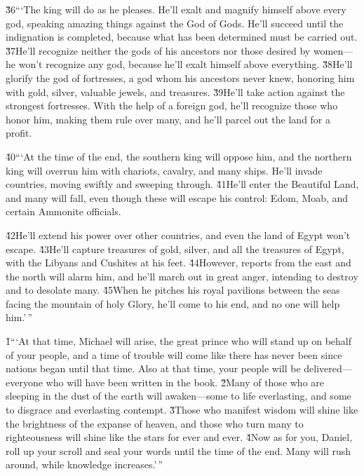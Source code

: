 \v{36}```The king will do as he pleases. He'll exalt and magnify himself above every god, speaking amazing things against the God of Gods. He'll succeed until the indignation is completed, because what has been determined must be carried out. \v{37}He'll recognize neither the gods of his ancestors nor those desired by women---he won't recognize any god, because he'll exalt himself above everything. \v{38}He'll glorify the god of fortresses, a god whom his ancestors never knew, honoring him with gold, silver, valuable jewels, and treasures. \v{39}He'll take action against the strongest fortresses. With the help of a foreign god, he'll recognize those who honor him, making them rule over many, and he'll parcel out the land for a profit.

\v{40}```At the time of the end, the southern king will oppose him, and the northern king will overrun him with chariots, cavalry, and many ships. He'll invade countries, moving swiftly and sweeping through. \v{41}He'll enter the Beautiful Land, and many will fall, even though these will escape his control: Edom, Moab, and certain Ammonite officials.

\v{42}He'll extend his power over other countries, and even the land of Egypt won't escape. \v{43}He'll capture treasures of gold, silver, and all the treasures of Egypt, with the Libyans and Cushites at his feet. \v{44}However, reports from the east and the north will alarm him, and he'll march out in great anger, intending to destroy and to desolate many. \v{45}When he pitches his royal pavilions between the seas facing the mountain of holy Glory, he'll come to his end, and no one will help him.'\,''

\v{1}```At that time, Michael will arise, the great prince who will stand up on behalf of your people, and a time of trouble will come like there has never been since nations began until that time. Also at that time, your people will be delivered---everyone who will have been written in the book. \v{2}Many of those who are sleeping in the dust of the earth will awaken---some to life everlasting, and some to disgrace and everlasting contempt. \v{3}Those who manifest wisdom will shine like the brightness of the expanse of heaven, and those who turn many to righteousness will shine like the stars for ever and ever. \v{4}Now as for you, Daniel, roll up your scroll and seal your words until the time of the end. Many will rush around, while knowledge increases.'\,''

